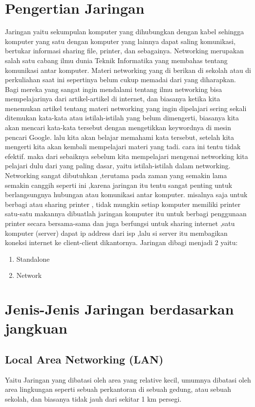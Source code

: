 
\section{Pengertian Jaringan}
  Jaringan yaitu sekumpulan komputer yang dihubungkan dengan kabel sehingga komputer yang satu dengan komputer yang lainnya dapat saling komunikasi, bertukar informasi sharing file, printer, dan sebagainya.
  Networking merupakan salah satu cabang ilmu dunia Teknik Informatika yang membahas tentang komunikasi antar komputer. Materi networking yang di berikan di sekolah atau di perkuliahan saat ini sepertinya belum cukup memadai dari yang diharapkan. Bagi mereka yang sangat ingin mendalami tentang ilmu networking bisa mempelajarinya dari artikel-artikel di internet, dan biasanya ketika kita menemukan artikel tentang materi networking yang ingin dipelajari sering sekali ditemukan kata-kata atau istilah-istilah yang belum dimengerti, biasanya kita akan mencari kata-kata tersebut dengan mengetikkan keywordnya di mesin pencari Google. lalu kita akan belajar memahami kata tersebut, setelah kita mengerti kita akan kembali mempelajari materi yang tadi. cara ini tentu tidak efektif. maka dari sebaiknya sebelum kita mempelajari mengenai networking kita pelajari dulu dari yang paling dasar, yaitu istilah-istilah dalam networking.
  Networking sangat dibutuhkan ,terutama pada zaman yang semakin lama semakin canggih seperti ini ,karena jaringan itu tentu sangat penting untuk berlangsungnya hubungan atau komunikasi antar komputer. misalnya saja untuk berbagi atau sharing printer , tidak mungkin setiap komputer memiliki printer satu-satu makannya dibuatlah jaringan komputer itu untuk berbagi penggunaan printer secara bersama-sama dan juga berfungsi untuk sharing internet ,satu komputer (server) dapat ip address dari isp ,lalu si server itu membagikan koneksi internet ke client-client dikantornya. Jaringan dibagi menjadi 2 yaitu:
  \begin{enumerate}
    \item Standalone
    \item Network
  \end{enumerate}

\section{Jenis-Jenis Jaringan berdasarkan jangkuan}
  \subsection{Local Area Networking (LAN)}
    Yaitu Jaringan yang dibatasi oleh area yang relative kecil, umumnya dibatasi oleh area lingkungan seperti sebuah perkantoran di sebuah gedung, atau sebuah sekolah, dan biasanya tidak jauh dari sekitar 1 km persegi.
